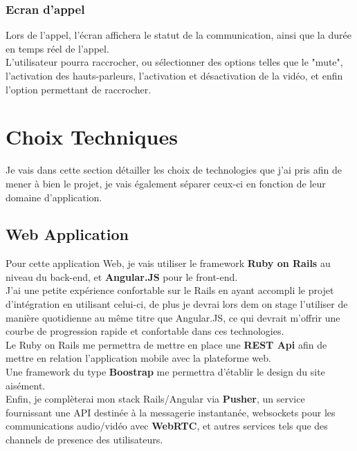 \documentclass{report}
\begin{document}
		\subsubsection{Ecran d'appel}

			Lors de l'appel, l'écran affichera le statut de la communication, ainsi que la durée en temps réel de l'appel.\\
			L'utilisateur pourra raccrocher, ou sélectionner des options telles que le "mute", l'activation des hauts-parleurs, l'activation et désactivation de la vidéo, et enfin l'option permettant de raccrocher.\\

\section{Choix Techniques}

	Je vais dans cette section détailler les choix de technologies que j'ai pris afin de mener à bien le projet, je vais également séparer ceux-ci en fonction de leur domaine d'application.\\

	\subsection{Web Application}

		Pour cette application Web, je vais utiliser le framework \textbf{Ruby on Rails} au niveau du back-end, et \textbf{Angular.JS} pour le front-end.\\
		J'ai une petite expérience confortable sur le Rails en ayant accompli le projet d'intégration en utilisant celui-ci, de plus je devrai lors dem on stage l'utiliser de manière quotidienne au même titre que Angular.JS, ce qui devrait m'offrir une courbe de progression rapide et confortable dans ces technologies.\\

		Le Ruby on Rails me permettra de mettre en place une \textbf{REST Api} afin de mettre en relation l'application mobile avec la plateforme web.\\

		Une framework du type \textbf{Boostrap} me permettra d'établir le design du site aisément.\\

		Enfin, je complèterai mon stack Rails/Angular via \textbf{Pusher}, un service fournissant une API destinée à la messagerie instantanée, websockets pour les communications audio/vidéo avec \textbf{WebRTC}, et autres services tels que des channels de presence des utilisateurs.\\
\end{document}
